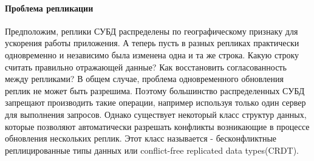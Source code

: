 \paragraph{Проблема репликации}
Предположим, реплики СУБД распределены по географическому признаку для ускорения работы приложения. А теперь пусть в разных репликах практически одновременно и независимо была изменена одна и та же строка. Какую строку считать правильно отражающей данные? Как восстановить согласованность между репликами? В общем случае, проблема одновременного обновления реплик не может быть разрешима. Поэтому большинство распределенных СУБД запрещают производить такие операции, например используя только один сервер для выполнения запросов. Однако существует некоторый класс структур данных, которые позволяют автоматически разрешать конфликты возникающие в процессе обновления нескольких реплик. Этот класс называется - бесконфликтные реплицированные типы данных или conflict-free replicated data types(CRDT). 
